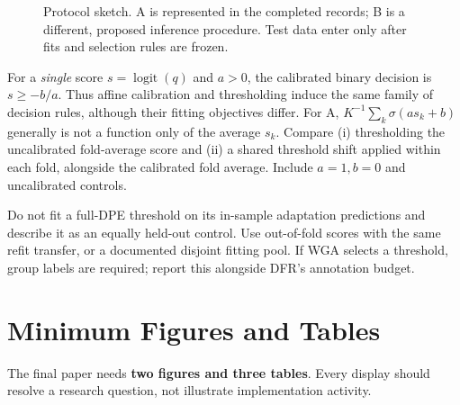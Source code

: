\documentclass[runningheads]{llncs}
\begin{document}
\begin{figure}[ht]
\centering
{}
\caption{Protocol sketch. A is represented in the completed records; B is a different, proposed inference procedure. Test data enter only after fits and selection rules are frozen.}
\end{figure}

For a \emph{single} score $s=\operatorname{logit}(q)$ and $a>0$, the calibrated binary decision is $s\geq-b/a$. Thus affine calibration and thresholding induce the same family of decision rules, although their fitting objectives differ. For A, $K^{-1}\sum_k\sigma(a s_k+b)$ generally is not a function only of the average $s_k$. Compare (i) thresholding the uncalibrated fold-average score and (ii) a shared threshold shift applied within each fold, alongside the calibrated fold average. Include $a=1,b=0$ and uncalibrated controls.

Do not fit a full-DPE threshold on its in-sample adaptation predictions and describe it as an equally held-out control. Use out-of-fold scores with the same refit transfer, or a documented disjoint fitting pool. If WGA selects a threshold, group labels are required; report this alongside DFR's annotation budget.


\section{Minimum Figures and Tables}
The final paper needs \textbf{two figures and three tables}. Every display should resolve a research question, not illustrate implementation activity.
\end{document}
